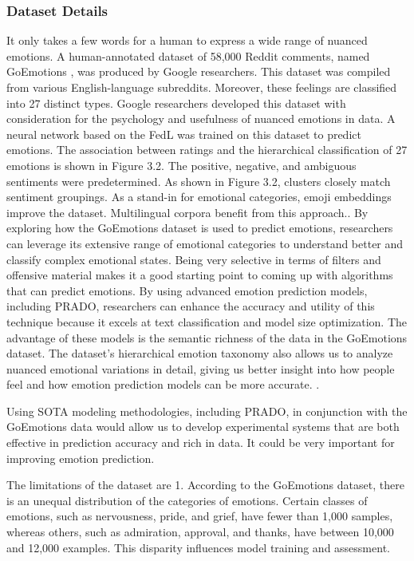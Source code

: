 \subsubsection*{Dataset Details}
It only takes a few words for a human to express a wide range of nuanced emotions. A human-annotated dataset of 58,000 Reddit comments, named GoEmotions \cite{ref77}, was produced by Google researchers. This dataset was compiled from various English-language subreddits. Moreover, these feelings are classified into 27 distinct types. Google researchers developed this dataset with consideration for the psychology and usefulness of nuanced emotions in data. A neural network based on the FedL was trained on this dataset to predict emotions. The association between ratings and the hierarchical classification of 27 emotions is shown in Figure 3.2. The positive, negative, and ambiguous sentiments were predetermined. As shown in Figure 3.2, clusters closely match sentiment groupings. As a stand-in for emotional categories, emoji embeddings improve the dataset. Multilingual corpora benefit from this approach.\cite{ref77}. By exploring how the GoEmotions dataset is used to predict emotions, researchers can leverage its extensive range of emotional categories to understand better and classify complex emotional states. Being very selective in terms of filters and offensive material makes it a good starting point to coming up with algorithms that can predict emotions. By using advanced emotion prediction models, including PRADO, researchers can enhance the accuracy and utility of this technique because it excels at text classification and model size optimization. The advantage of these models is the semantic richness of the data in the GoEmotions dataset. The dataset's hierarchical emotion taxonomy also allows us to analyze nuanced emotional variations in detail, giving us better insight into how people feel and how emotion prediction models can be more accurate.  \cite{ref77}.

Using SOTA modeling methodologies, including PRADO, in conjunction with the GoEmotions data would allow us to develop experimental systems that are both effective in prediction accuracy and rich in data. It could be very important for improving emotion prediction.

The limitations of the dataset are  1. According to the GoEmotions dataset, there is an unequal distribution of the categories of emotions. Certain classes of emotions, such as nervousness, pride, and grief, have fewer than 1,000 samples, whereas others, such as admiration, approval, and thanks, have between 10,000 and 12,000 examples. This disparity influences model training and assessment.

